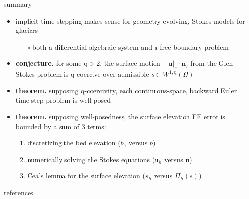 \documentclass[10pt,svgnames]{beamer}
\newcommand{\bn}{\mathbf{n}}
\newcommand{\bu}{\mathbf{u}}
\newcommand{\qq}{\mathrm{q}}
\begin{document}
\begin{frame}{summary}
\begin{itemize}
\item implicit time-stepping makes sense for geometry-evolving, Stokes models for glaciers
    \begin{itemize}
    \item[$\circ$] both a differential-algebraic system and a free-boundary problem
    \end{itemize}
\item \textbf{conjecture.} for some $\qq>2$, the surface motion $-\bu|_s\cdot \bn_s$ from the Glen-Stokes problem is $\qq$-coercive over admissible $s\in W^{1,\qq}(\Omega)$
\item \textbf{theorem.} supposing $\qq$-coercivity, each continuous-space, backward Euler time step problem is well-posed
\item \textbf{theorem.} supposing well-posedness, the surface elevation FE error is bounded by a sum of 3 terms:
    \begin{enumerate}
    \item discretizing the bed elevation ($b_h$ versus $b$)
    \item numerically solving the Stokes equations ($\bu_h$ versus $\bu$)
    \item Cea's lemma for the surface elevation ($s_h$ versus $\Pi_h(s)$) \strut
    \end{enumerate}
\end{itemize}
\end{frame}


\begin{frame}{references}

{\footnotesize }
\end{frame}
\end{document}
